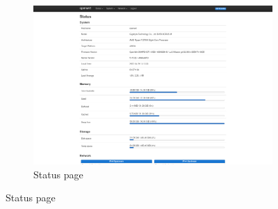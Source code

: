 \begin{figure}[H]
    \centering

    \begin{subfigure}{1\linewidth}
        \centering
        \includegraphics[height=0.65\linewidth]{immagini/LuCI_status}
        \caption{Status page}
        \label{fig:luci-status}
    \end{subfigure}%

    \medskip


\end{figure}
